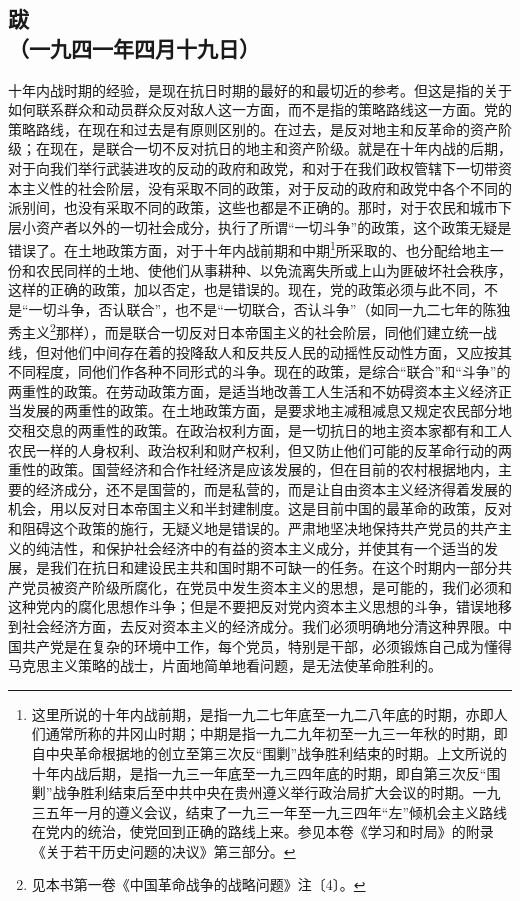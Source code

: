 \documentclass[cn,11pt,chinese]{elegantbook}
\def\myformat#1{\hfil\hfil #1}
\begin{document}
\subsection*{\myformat{跋}\\\myformat{（一九四一年四月十九日）}}
十年内战时期的经验，是现在抗日时期的最好的和最切近的参考。但这是指的关于如何联系群众和动员群众反对敌人这一方面，而不是指的策略路线这一方面。党的策略路线，在现在和过去是有原则区别的。在过去，是反对地主和反革命的资产阶级；在现在，是联合一切不反对抗日的地主和资产阶级。就是在十年内战的后期，对于向我们举行武装进攻的反动的政府和政党，和对于在我们政权管辖下一切带资本主义性的社会阶层，没有采取不同的政策，对于反动的政府和政党中各个不同的派别间，也没有采取不同的政策，这些也都是不正确的。那时，对于农民和城市下层小资产者以外的一切社会成分，执行了所谓“一切斗争”的政策，这个政策无疑是错误了。在土地政策方面，对于十年内战前期和中期\footnote[5]{ 这里所说的十年内战前期，是指一九二七年底至一九二八年底的时期，亦即人们通常所称的井冈山时期；中期是指一九二九年初至一九三一年秋的时期，即自中央革命根据地的创立至第三次反“围剿”战争胜利结束的时期。上文所说的十年内战后期，是指一九三一年底至一九三四年底的时期，即自第三次反“围剿”战争胜利结束后至中共中央在贵州遵义举行政治局扩大会议的时期。一九三五年一月的遵义会议，结束了一九三一年至一九三四年“左”倾机会主义路线在党内的统治，使党回到正确的路线上来。参见本卷《学习和时局》的附录《关于若干历史问题的决议》第三部分。}所采取的、也分配给地主一份和农民同样的土地、使他们从事耕种、以免流离失所或上山为匪破坏社会秩序，这样的正确的政策，加以否定，也是错误的。现在，党的政策必须与此不同，不是“一切斗争，否认联合”，也不是“一切联合，否认斗争”（如同一九二七年的陈独秀主义\footnote[6]{ 见本书第一卷《中国革命战争的战略问题》注〔4〕。}那样），而是联合一切反对日本帝国主义的社会阶层，同他们建立统一战线，但对他们中间存在着的投降敌人和反共反人民的动摇性反动性方面，又应按其不同程度，同他们作各种不同形式的斗争。现在的政策，是综合“联合”和“斗争”的两重性的政策。在劳动政策方面，是适当地改善工人生活和不妨碍资本主义经济正当发展的两重性的政策。在土地政策方面，是要求地主减租减息又规定农民部分地交租交息的两重性的政策。在政治权利方面，是一切抗日的地主资本家都有和工人农民一样的人身权利、政治权利和财产权利，但又防止他们可能的反革命行动的两重性的政策。国营经济和合作社经济是应该发展的，但在目前的农村根据地内，主要的经济成分，还不是国营的，而是私营的，而是让自由资本主义经济得着发展的机会，用以反对日本帝国主义和半封建制度。这是目前中国的最革命的政策，反对和阻碍这个政策的施行，无疑义地是错误的。严肃地坚决地保持共产党员的共产主义的纯洁性，和保护社会经济中的有益的资本主义成分，并使其有一个适当的发展，是我们在抗日和建设民主共和国时期不可缺一的任务。在这个时期内一部分共产党员被资产阶级所腐化，在党员中发生资本主义的思想，是可能的，我们必须和这种党内的腐化思想作斗争；但是不要把反对党内资本主义思想的斗争，错误地移到社会经济方面，去反对资本主义的经济成分。我们必须明确地分清这种界限。中国共产党是在复杂的环境中工作，每个党员，特别是干部，必须锻炼自己成为懂得马克思主义策略的战士，片面地简单地看问题，是无法使革命胜利的。\\
\end{document}
